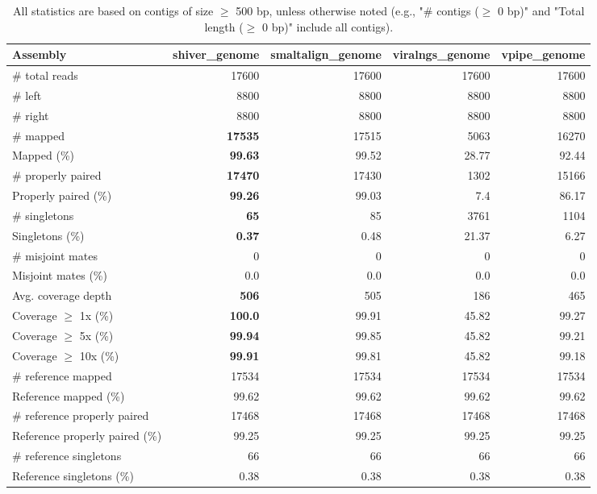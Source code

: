 \documentclass[12pt,a4paper]{article}
\begin{document}
\begin{table}[ht]
\begin{center}
\caption{All statistics are based on contigs of size $\geq$ 500 bp, unless otherwise noted (e.g., "\# contigs ($\geq$ 0 bp)" and "Total length ($\geq$ 0 bp)" include all contigs).}
\begin{tabular}{|l*{4}{|r}|}
\hline
Assembly & shiver\_genome & smaltalign\_genome & viralngs\_genome & vpipe\_genome \\ \hline
\# total reads & 17600 & 17600 & 17600 & 17600 \\ \hline
\# left & 8800 & 8800 & 8800 & 8800 \\ \hline
\# right & 8800 & 8800 & 8800 & 8800 \\ \hline
\# mapped & {\bf 17535} & 17515 & 5063 & 16270 \\ \hline
Mapped (\%) & {\bf 99.63} & 99.52 & 28.77 & 92.44 \\ \hline
\# properly paired & {\bf 17470} & 17430 & 1302 & 15166 \\ \hline
Properly paired (\%) & {\bf 99.26} & 99.03 & 7.4 & 86.17 \\ \hline
\# singletons & {\bf 65} & 85 & 3761 & 1104 \\ \hline
Singletons (\%) & {\bf 0.37} & 0.48 & 21.37 & 6.27 \\ \hline
\# misjoint mates & 0 & 0 & 0 & 0 \\ \hline
Misjoint mates (\%) & 0.0 & 0.0 & 0.0 & 0.0 \\ \hline
Avg. coverage depth & {\bf 506} & 505 & 186 & 465 \\ \hline
Coverage $\geq$ 1x (\%) & {\bf 100.0} & 99.91 & 45.82 & 99.27 \\ \hline
Coverage $\geq$ 5x (\%) & {\bf 99.94} & 99.85 & 45.82 & 99.21 \\ \hline
Coverage $\geq$ 10x (\%) & {\bf 99.91} & 99.81 & 45.82 & 99.18 \\ \hline
\# reference mapped & 17534 & 17534 & 17534 & 17534 \\ \hline
Reference mapped (\%) & 99.62 & 99.62 & 99.62 & 99.62 \\ \hline
\# reference properly paired & 17468 & 17468 & 17468 & 17468 \\ \hline
Reference properly paired (\%) & 99.25 & 99.25 & 99.25 & 99.25 \\ \hline
\# reference singletons & 66 & 66 & 66 & 66 \\ \hline
Reference singletons (\%) & 0.38 & 0.38 & 0.38 & 0.38 \\ \hline

\end{tabular}
\end{center}
\end{table}
\end{document}
